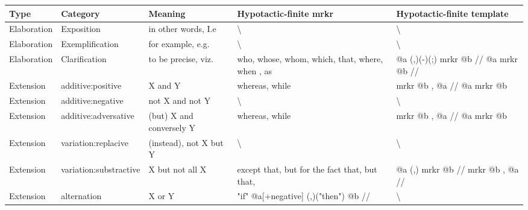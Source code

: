 \begin{landscape}
		\begin{longtable}{|l|l|p{3cm}|p{5cm}|p{5cm}|}
			\hline
			{\bf Type}  & {\bf Category}         & {\bf Meaning}                        & {\bf Hypotactic-finite mrkr}                                                  & {\bf Hypotactic-finite template}             \\ \hline
			Elaboration & Exposition             & in other words, I.e                  & \textbackslash                                                                & \textbackslash                               \\ \hline
			Elaboration & Exemplification        & for example, e.g.                    & \textbackslash                                                                & \textbackslash                               \\ \hline
			Elaboration & Clarification          & to be precise, viz.                  & who, whose, whom, which, that, where, when , as                               & @a (,)(-)(;) mrkr @b // @a mrkr @b //        \\ \hline
			Extension   & additive:positive      & X and Y                              & whereas, while                                                                & mrkr @b , @a // @a mrkr @b                   \\ \hline
			Extension   & additive:negative      & not X and not Y                      & \textbackslash                                                                & \textbackslash                               \\ \hline
			Extension   & additive:adversative   & (but) X and conversely Y             & whereas, while                                                                & mrkr @b , @a // @a mrkr @b                   \\ \hline
			Extension   & variation:replacive    & (instead), not X but Y               & \textbackslash                                                                & \textbackslash                               \\ \hline
			Extension   & variation:substractive & X but not all X                      & except that, but for the fact that, but that,                                 & @a (,) mrkr @b // mrkr @b , @a //            \\ \hline
			Extension   & alternation            & X or Y                               & "if" @a{[}+negative{]} (,)("then") @b //                                      & \textbackslash                               \\ \hline

\end{longtable}
\end{landscape}
